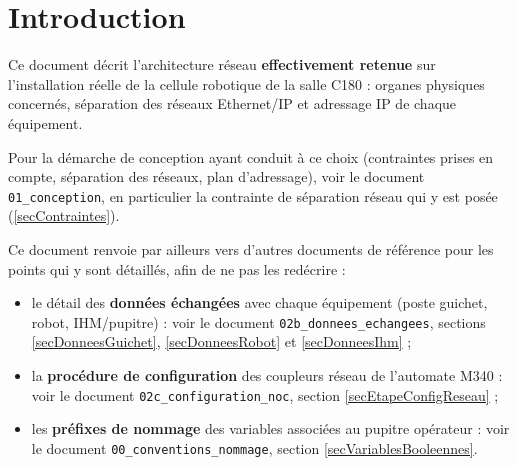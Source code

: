 \section{Introduction}
\label{secIntroductionArchiReseau}

Ce document décrit l'architecture réseau \textbf{effectivement retenue} sur
l'installation réelle de la cellule robotique de la salle C180 : organes
physiques concernés, séparation des réseaux Ethernet/IP et adressage IP de
chaque équipement.

Pour la démarche de conception ayant conduit à ce choix (contraintes prises
en compte, séparation des réseaux, plan d'adressage), voir le document
\texttt{01\_conception}, en particulier la contrainte de séparation réseau
qui y est posée (\ref{secContraintes}).

Ce document renvoie par ailleurs vers d'autres documents de référence pour
les points qui y sont détaillés, afin de ne pas les redécrire :
\begin{itemize}
    \item le détail des \textbf{données échangées} avec chaque équipement
    (poste guichet, robot, IHM/pupitre) : voir le document
    \texttt{02b\_donnees\_echangees}, sections \ref{secDonneesGuichet},
    \ref{secDonneesRobot} et \ref{secDonneesIhm} ;
    \item la \textbf{procédure de configuration} des coupleurs réseau de
    l'automate M340 : voir le document \texttt{02c\_configuration\_noc},
    section \ref{secEtapeConfigReseau} ;
    \item les \textbf{préfixes de nommage} des variables associées au
    pupitre opérateur : voir le document \texttt{00\_conventions\_nommage},
    section \ref{secVariablesBooleennes}.
\end{itemize}
